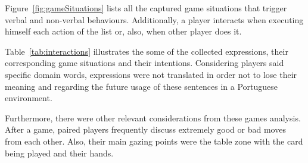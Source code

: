 Figure~\ref{fig:gameSituations} lists all the captured game situations that trigger verbal and non-verbal behaviours.
Additionally, a player interacts when executing himself each action of the list or, also, when other player does it.


\begin{table}[h]
\caption{Examples of expressions collected during the card game activity and its respective classification.}
\label{tab:interactions}
\end{table}


Table~\ref{tab:interactions} illustrates the some of the collected expressions, their corresponding game situations and their intentions.
Considering players said specific domain words, expressions were not translated in order not to lose their meaning and regarding the future usage of these sentences in a Portuguese environment.

Furthermore, there were other relevant considerations from these games analysis.
After a game, paired players frequently discuss extremely good or bad moves from each other.
Also, their main gazing points were the table zone with the card being played and their hands.

\clearpage


